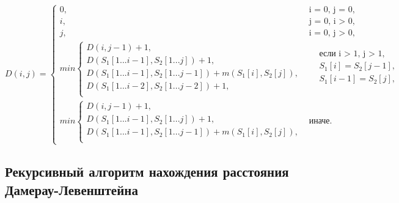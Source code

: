 \begin{equation}
	\label{eq:DL}
	D(i, j) = 
	\begin{cases}
		0, &\text{i = 0, j = 0,}\\
		i, &\text{j = 0, i > 0,}\\
		j, &\text{i = 0, j > 0,}\\
		min \begin{cases}
			D(i, j - 1) + 1,\\
			D(S_{1}[1...i-1], S_{2}[1...j]) + 1,\\
			D(S_{1}[1...i-1], S_{2}[1...j-1]) + m(S_{1}[i], S_{2}[j]), \\
			D(S_{1}[1...i-2], S_{2}[1...j-2]) + 1, \\
		\end{cases}
		& \begin{aligned}
			& \text{если i > 1, j > 1}, \\
			& S_{1}[i] = S_{2}[j - 1], \\
			& S_{1}[i - 1] = S_{2}[j], \\
		\end{aligned}\\
		min \begin{cases}
			D(i, j - 1) + 1,\\
			D(S_{1}[1...i-1], S_{2}[1...j]) + 1, \\
			D(S_{1}[1...i-1], S_{2}[1...j-1]) + m(S_{1}[i], S_{2}[j]), \\
		\end{cases}
		 & \text{иначе.}
	\end{cases}
\end{equation}

\subsection{Рекурсивный алгоритм нахождения расстояния Дамерау-Левенштейна}

